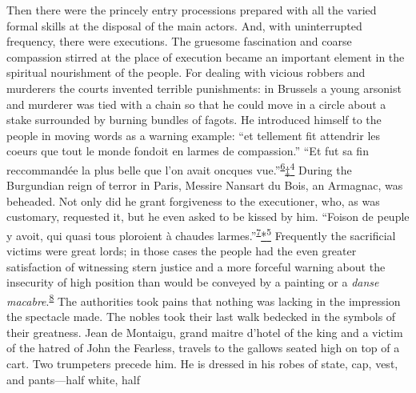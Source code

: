 Then there were the princely entry processions prepared with all the
varied formal skills at the disposal of the main actors. And, with
uninterrupted frequency, there were executions. The gruesome fascination
and coarse compassion stirred at the place of execution became an
important element in the spiritual nourishment of the people. For
dealing with vicious robbers and murderers the courts invented terrible
punishments: in Brussels a young arsonist and murderer was tied with a
chain so that he could move in a circle about a stake surrounded by
burning bundles of fagots. He introduced himself to the people in moving
words as a warning example: ``et tellement fit attendrir les coeurs que
tout le monde fondoit en larmes de compassion.'' ``Et fut sa fin
reccommandée la plus belle que l'on avait oncques
vue.''\textsuperscript{\protect\hypertarget{08_Chapter_One__THE_PASSIONATE_INTE.xhtmlux5cux23id_2218}{\protect\hyperlink{23_NOTES.xhtmlux5cux23id_2219}{6}}}\protect\hypertarget{08_Chapter_One__THE_PASSIONATE_INTE.xhtmlux5cux23id_2256}{\protect\hyperlink{23_NOTES.xhtmlux5cux23id_2255}{‡\textsuperscript{4}}}
During the Burgundian reign of terror in Paris, Messire Nansart du Bois,
an Armagnac,
\protect\hypertarget{08_Chapter_One__THE_PASSIONATE_INTE.xhtmlux5cux23page_4}{}{}was
beheaded. Not only did he grant forgiveness to the executioner, who, as
was customary, requested it, but he even asked to be kissed by him.
``Foison de peuple y avoit, qui quasi tous ploroient à chaudes
larmes.''\textsuperscript{\protect\hypertarget{08_Chapter_One__THE_PASSIONATE_INTE.xhtmlux5cux23id_2216}{\protect\hyperlink{23_NOTES.xhtmlux5cux23id_2217}{7}}}\protect\hypertarget{08_Chapter_One__THE_PASSIONATE_INTE.xhtmlux5cux23id_2254}{\protect\hyperlink{23_NOTES.xhtmlux5cux23id_2253}{*\textsuperscript{5}}}
Frequently the sacrificial victims were great lords; in those cases the
people had the even greater satisfaction of witnessing stern justice and
a more forceful warning about the insecurity of high position than would
be conveyed by a painting or a \emph{danse
macabre}.\textsuperscript{\protect\hypertarget{08_Chapter_One__THE_PASSIONATE_INTE.xhtmlux5cux23id_2214}{\protect\hyperlink{23_NOTES.xhtmlux5cux23id_2215}{8}}}
The authorities took pains that nothing was lacking in the impression
the spectacle made. The nobles took their last walk bedecked in the
symbols of their greatness. Jean de Montaigu, grand maitre d'hotel of
the king and a victim of the hatred of John the Fearless, travels to the
gallows seated high on top of a cart. Two trumpeters precede him. He is
dressed in his robes of state, cap, vest, and pants---half white, half
